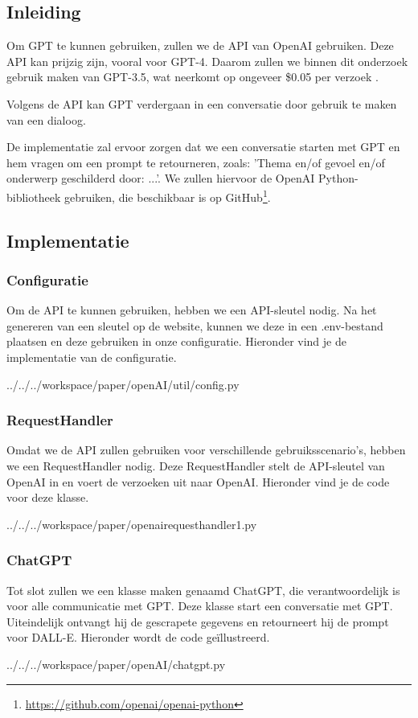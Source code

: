 \subsection{Inleiding}
Om GPT te kunnen gebruiken, zullen we de API van OpenAI gebruiken. Deze API kan prijzig zijn, vooral voor GPT-4. Daarom zullen we binnen dit onderzoek gebruik maken van GPT-3.5, wat neerkomt op ongeveer \$0.05 per verzoek \autocite{gpt_pricing}.

Volgens de API kan GPT verdergaan in een conversatie door gebruik te maken van een dialoog.

De implementatie zal ervoor zorgen dat we een conversatie starten met GPT en hem vragen om een prompt te retourneren, zoals: 'Thema en/of gevoel en/of onderwerp geschilderd door: ...'. We zullen hiervoor de OpenAI Python-bibliotheek gebruiken, die beschikbaar is op GitHub\footnote{\url{https://github.com/openai/openai-python}}.

\subsection{Implementatie}
\subsubsection{Configuratie}
Om de API te kunnen gebruiken, hebben we een API-sleutel nodig. Na het genereren van een sleutel op de website, kunnen we deze in een .env-bestand plaatsen en deze gebruiken in onze configuratie. Hieronder vind je de implementatie van de configuratie.
\begin{pythoncode}{../../../workspace/paper/openAI/util/config.py}
\end{pythoncode}

\subsubsection{RequestHandler}
Omdat we de API zullen gebruiken voor verschillende gebruiksscenario's, hebben we een RequestHandler nodig. Deze RequestHandler stelt de API-sleutel van OpenAI in en voert de verzoeken uit naar OpenAI. Hieronder vind je de code voor deze klasse.
\begin{pythoncode}{../../../workspace/paper/openairequesthandler1.py}
\end{pythoncode}

\subsubsection{ChatGPT}
Tot slot zullen we een klasse maken genaamd ChatGPT, die verantwoordelijk is voor alle communicatie met GPT. Deze klasse start een conversatie met GPT. Uiteindelijk ontvangt hij de gescrapete gegevens en retourneert hij de prompt voor DALL-E. Hieronder wordt de code geïllustreerd.
\begin{pythoncode}{../../../workspace/paper/openAI/chatgpt.py}
\end{pythoncode}

